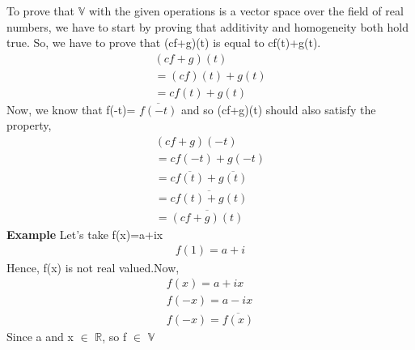   To prove that $\mathbb{V}$ with the given operations is a vector space over the field of real numbers, we have to start by proving that additivity and homogeneity both hold true.
 So, we have to prove that (cf+g)(t) is equal to cf(t)+g(t).
 \begin{align}
 (cf+g)(t)\\
 =(cf)(t)+g(t)\\
 =cf(t)+g(t)
 \end{align}
 Now, we know that f(-t)= $\overline{f(-t)}$ and so (cf+g)(t) should also satisfy the property,
 \begin{align}
 (cf+g)(-t)\\
 =cf(-t)+g(-t)\\
 =c\overline{f(t)}+\overline{g(t)}\\
 =\overline{cf(t)+g(t)}\\
 =\overline{(cf+g)(t)}
 \end{align}
 {\textbf{Example}}
 Let's take f(x)=a+ix
 \begin{align}
 f(1)=a+i
 \end{align}
 Hence, f(x) is not real valued.Now,
 \begin{align}
 f(x)=a+ix\\
 f(-x)=a-ix\\
 f(-x)=\overline{f(x)}
 \end{align}
 Since a and x $\in$ $\mathbb{R}$, so f $\in$ $\mathbb{V}$
